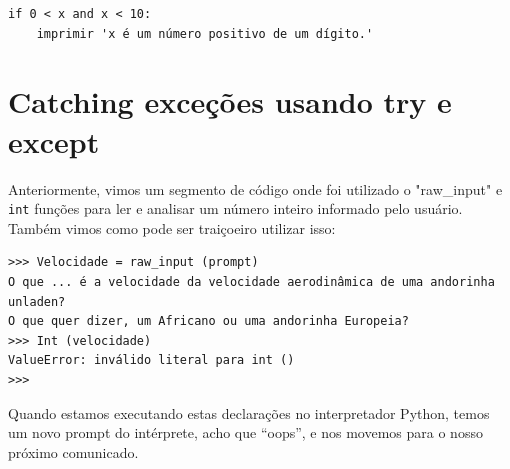 
\beforeverb
\begin{verbatim}
if 0 < x and x < 10:
    imprimir 'x é um número positivo de um dígito.'
\end{verbatim}
\afterverb

\section{Catching exceções usando try e except}
\label{catch1}

Anteriormente, vimos um segmento de código onde foi utilizado o 
\verbo"raw_input" e {\tt int} funções para ler e analisar um 
número inteiro informado pelo usuário. 
Também vimos como pode ser traiçoeiro utilizar isso:


\beforeverb
\begin{verbatim}
>>> Velocidade = raw_input (prompt)
O que ... é a velocidade da velocidade aerodinâmica de uma andorinha unladen?
O que quer dizer, um Africano ou uma andorinha Europeia?
>>> Int (velocidade)
ValueError: inválido literal para int ()
>>>
\end{verbatim}
\afterverb
%
Quando estamos executando estas declarações no interpretador Python,
temos um novo prompt do intérprete, acho que ``oops'', e nos movemos
para o nosso próximo comunicado.


